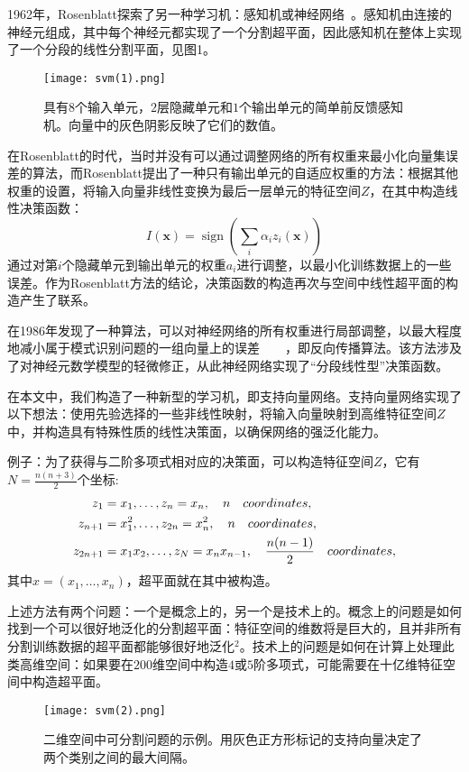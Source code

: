 \documentclass[lang=cn,11pt,a4paper]{elegantpaper}
\newcommand{\upcite}[1]{\textsuperscript{\textsuperscript{\cite{#1}}}}
\begin{document}
	1962年，Rosenblatt探索了另一种学习机：感知机或神经网络~\upcite{rosenblatt1962principles}。感知机由连接的神经元组成，其中每个神经元都实现了一个分割超平面，因此感知机在整体上实现了一个分段的线性分割平面，见图1。
	\begin{figure}[htbp]
		\centering
		\texttt{[image: svm(1).png]}
		\caption{具有$8$个输入单元，$2$层隐藏单元和$1$个输出单元的简单前反馈感知机。向量中的灰色阴影反映了它们的数值。}
	\end{figure}

	在Rosenblatt的时代，当时并没有可以通过调整网络的所有权重来最小化向量集误差的算法，而Rosenblatt提出了一种只有输出单元的自适应权重的方法：根据其他权重的设置，将输入向量非线性变换为最后一层单元的特征空间$Z$，在其中构造线性决策函数：
	\begin{equation}
		I(\mathbf{x})=\operatorname{sign}\left(\sum_{i} \alpha_{i} z_{i}(\mathbf{x})\right)\tag{4}
	\end{equation}
	通过对第$i$个隐藏单元到输出单元的权重$a_i$进行调整，以最小化训练数据上的一些误差。作为Rosenblatt方法的结论，决策函数的构造再次与空间中线性超平面的构造产生了联系。

	在1986年发现了一种算法，可以对神经网络的所有权重进行局部调整，以最大程度地减小属于模式识别问题的一组向量上的误差~\upcite{rumelhart1985learning}~\upcite{rumelhart1986learning}~\upcite{parker1985learning}~\upcite{lecun1985procedure}，即反向传播算法。该方法涉及了对神经元数学模型的轻微修正，从此神经网络实现了“分段线性型”决策函数。

	在本文中，我们构造了一种新型的学习机，即支持向量网络。支持向量网络实现了以下想法：使用先验选择的一些非线性映射，将输入向量映射到高维特征空间$Z$中，并构造具有特殊性质的线性决策面，以确保网络的强泛化能力。

	例子：为了获得与二阶多项式相对应的决策面，可以构造特征空间$Z$，它有$N=\frac{n(n+3)}{2}$个坐标:
	\begin{align}
		z_{1}&=x_{1},\ldots,z_{n}=x_{n},\quad n \quad coordinates, \notag \\ 
		z_{n+1}&=x_{1}^{2},\ldots,z_{2n}=x_{n}^{2},\quad n\quad coordinates, \notag \\
		z_{2n+1}&=x_{1} x_{2},\ldots,z_{N}=x_{n} x_{n-1},\quad \frac{n(n-1)}{2} \quad coordinates,\notag
	\end{align}
	其中$x=(x_1,\ldots,x_n)$，超平面就在其中被构造。

	上述方法有两个问题：一个是概念上的，另一个是技术上的。概念上的问题是如何找到一个可以很好地泛化的分割超平面：特征空间的维数将是巨大的，且并非所有分割训练数据的超平面都能够很好地泛化$^2$。技术上的问题是如何在计算上处理此类高维空间：如果要在$200$维空间中构造$4$或$5$阶多项式，可能需要在十亿维特征空间中构造超平面。
	\begin{figure}[htbp]
		\centering
		\texttt{[image: svm(2).png]}
		\caption{二维空间中可分割问题的示例。用灰色正方形标记的支持向量决定了两个类别之间的最大间隔。}
	\end{figure}
\end{document}

